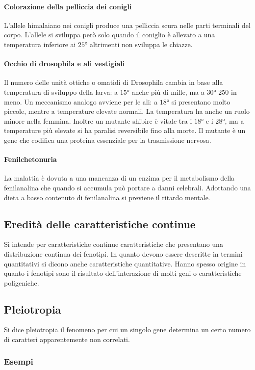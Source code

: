 \paragraph{Colorazione della pelliccia dei conigli}
L'allele himalaiano nei conigli produce una pelliccia scura nelle parti terminali del corpo. L'allele si sviluppa per\`o solo quando il coniglio \`e allevato a una temperatura inferiore ai $25\si{\degree}$
altrimenti non sviluppa le chiazze.
\paragraph{Occhio di drosophila e ali vestigiali}
Il numero delle unit\`a ottiche o omatidi di Drosophila cambia in base alla temperatura di sviluppo della larva: a $15\si{\degree}$ anche pi\`u di mille, ma a $30\si{\degree}$ $250$ in meno. Un
meccanismo analogo avviene per le ali: a $18\si{\degree}$ si presentano molto piccole, mentre a temperature elevate normali. La temperatura ha anche un ruolo minore nella femmina. Inoltre un 
mutante shibire \`e vitale tra i $18\si{\degree}$ e i $28\si{\degree}$, ma a temperature pi\`u elevate si ha paralisi reversibile fino alla morte. Il mutante \`e un gene che codifica una proteina
essenziale per la trasmissione nervosa. 
\paragraph{Fenilchetonuria}
La malattia \`e dovuta a una mancanza di un enzima per il metabolismo della fenilanalina che quando si accumula pu\`o portare a danni celebrali. Adottando una dieta a basso contenuto di fenilanalina
si previene il ritardo mentale. 
\subsection{Eredit\`a delle caratteristiche continue}
Si intende per caratteristiche continue caratteristiche che presentano una distribuzione continua dei fenotipi. In quanto devono essere descritte in termini quantitativi si dicono anche caratteristiche
quantitative. Hanno spesso origine in quanto i fenotipi sono il risultato dell'interazione di molti geni o caratteristiche poligeniche.
\subsection{Pleiotropia}
Si dice pleiotropia il fenomeno per cui un singolo gene determina un certo numero di caratteri apparentemente non correlati.
\subsubsection{Esempi}
